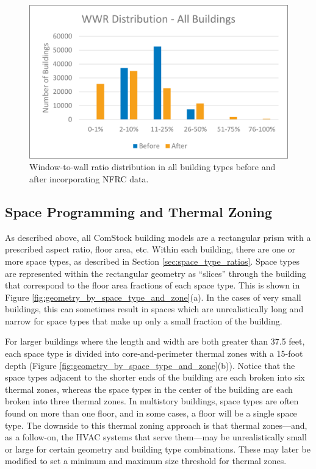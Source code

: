     \begin{figure}[h!]
    \centering \includegraphics[width=\textwidth]{figures/wwr_before_after_all_buildings.png}
    \caption[Window-to-wall ratio distribution]{Window-to-wall ratio distribution in all building types before and after incorporating NFRC data.}
    \label{fig:wwr_before_after_all_buildings}
    \end{figure} 

\pagebreak

\subsection{Space Programming and Thermal Zoning}
As described above, all ComStock building models are a rectangular prism with a prescribed aspect ratio, floor area, etc. Within each building, there are one or more space types, as described in Section \ref{sec:space_type_ratios}. Space types are represented within the rectangular geometry as ``slices'' through the building that correspond to the floor area fractions of each space type. This is shown in Figure \ref{fig:geometry_by_space_type_and_zone}(a). In the cases of very small buildings, this can sometimes result in spaces which are unrealistically long and narrow for space types that make up only a small fraction of the building.

For larger buildings where the length and width are both greater than 37.5 feet, each space type is divided into core-and-perimeter thermal zones with a 15-foot depth (Figure \ref{fig:geometry_by_space_type_and_zone}(b)). Notice that the space types adjacent to the shorter ends of the building are each broken into six thermal zones, whereas the space types in the center of the building are each broken into three thermal zones. In multistory buildings, space types are often found on more than one floor, and in some cases, a floor will be a single space type. The downside to this thermal zoning approach is that thermal zones---and, as a follow-on, the HVAC systems that serve them---may be unrealistically small or large for certain geometry and building type combinations. These may later be modified to set a minimum and maximum size threshold for thermal zones.

